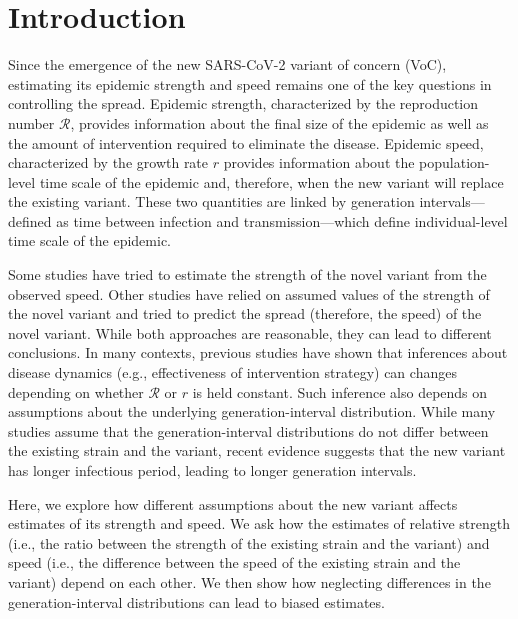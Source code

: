 \documentclass[12pt]{article}
\date{\today}
\newcommand{\RR}{\ensuremath{{\mathcal R}}\xspace}
\begin{document}
\begin{flushleft}{
	\Large
	\textbf{}
}
\end{flushleft}

\section{Introduction}

Since the emergence of the new SARS-CoV-2 variant of concern (VoC), estimating its epidemic strength and speed remains one of the key questions in controlling the spread.
Epidemic strength, characterized by the reproduction number $\RR$, provides information about the final size of the epidemic as well as the amount of intervention required to eliminate the disease.
Epidemic speed, characterized by the growth rate $r$ provides information about the population-level time scale of the epidemic and, therefore, when the new variant will replace the existing variant.
These two quantities are linked by generation intervals---defined as time between infection and transmission---which define individual-level time scale of the epidemic.

Some studies have tried to estimate the strength of the novel variant from the observed speed.
Other studies have relied on assumed values of the strength of the novel variant and tried to predict the spread (therefore, the speed) of the novel variant.
While both approaches are reasonable, they can lead to different conclusions.
In many contexts, previous studies have shown that inferences about disease dynamics (e.g., effectiveness of intervention strategy) can changes depending on whether $\RR$ or $r$ is held constant.
Such inference also depends on assumptions about the underlying generation-interval distribution.
While many studies assume that the generation-interval distributions do not differ between the existing strain and the variant, recent evidence suggests that the new variant has longer infectious period, leading to longer generation intervals.

Here, we explore how different assumptions about the new variant affects estimates of its strength and speed.
We ask how the estimates of relative strength (i.e., the ratio between the strength of the existing strain and the variant) and speed (i.e., the difference between the speed of the existing strain and the variant) depend on each other.
We then show how neglecting differences in the generation-interval distributions can lead to biased estimates.
\end{document}
